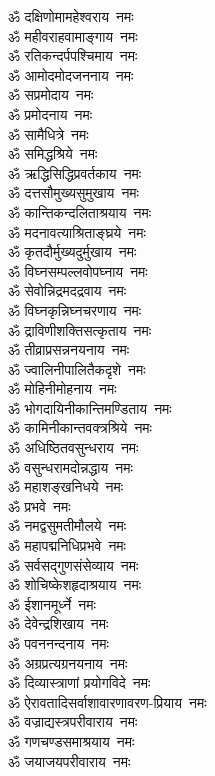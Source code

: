 \begin{multicols}{2}
\begin{flushleft}
ॐ दक्षिणोमामहेश्वराय~नमः\\
ॐ महीवराहवामाङ्गाय~नमः\\
ॐ रतिकन्दर्पपश्चिमाय~नमः\\
ॐ आमोदमोदजननाय~नमः\\
ॐ सप्रमोदाय~नमः\\
ॐ प्रमोदनाय~नमः\\
ॐ सामैधित्रे~नमः\\
ॐ समिद्धश्रिये~नमः\\
ॐ ऋद्धिसिद्धिप्रवर्तकाय~नमः\\
ॐ दत्तसौमुख्यसुमुखाय~नमः\hfill{}\\
ॐ कान्तिकन्दलिताश्रयाय~नमः\\
ॐ मदनावत्याश्रिताङ्घ्रये~नमः\\
ॐ कृतदौर्मुख्यदुर्मुखाय~नमः\\
ॐ विघ्नसम्पल्लवोपघ्नाय~नमः\\
ॐ सेवोन्निद्रमदद्रवाय~नमः\\
ॐ विघ्नकृन्निघ्नचरणाय~नमः\\
ॐ द्राविणीशक्तिसत्कृताय~नमः\\
ॐ तीव्राप्रसन्ननयनाय~नमः\\
ॐ ज्वालिनीपालितैकदृशे~नमः\\
ॐ मोहिनीमोहनाय~नमः\hfill{}\\
ॐ भोगदायिनीकान्तिमण्डिताय~नमः\\
ॐ कामिनीकान्तवक्त्रश्रिये~नमः\\
ॐ अधिष्ठितवसुन्धराय~नमः\\
ॐ वसुन्धरामदोन्नद्धाय~नमः\\
ॐ महाशङ्खनिधये~नमः\\
ॐ प्रभवे~नमः\\
ॐ नमद्वसुमतीमौलये~नमः\\
ॐ महापद्मनिधिप्रभवे~नमः\\
ॐ सर्वसद्गुणसंसेव्याय~नमः\\
ॐ शोचिष्केशहृदाश्रयाय~नमः\hfill{}\\
ॐ ईशानमूर्ध्ने~नमः\\
ॐ देवेन्द्रशिखाय~नमः\\
ॐ पवननन्दनाय~नमः\\
ॐ अग्रप्रत्यग्रनयनाय~नमः\\
ॐ दिव्यास्त्राणां प्रयोगविदे~नमः\\
ॐ ऐरावतादिसर्वाशावारणावरण-प्रियाय~नमः\\
ॐ वज्राद्यस्त्रपरीवाराय~नमः\\
ॐ गणचण्डसमाश्रयाय~नमः\\
ॐ जयाजयपरीवाराय~नमः\\

\end{flushleft}
\end{multicols}
